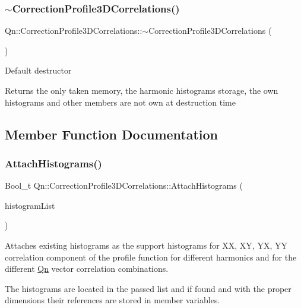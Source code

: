 \subsubsection{\texorpdfstring{$\sim$\+Correction\+Profile3\+D\+Correlations()}{~CorrectionProfile3DCorrelations()}}
{\footnotesize\ttfamily Qn\+::\+Correction\+Profile3\+D\+Correlations\+::$\sim$\+Correction\+Profile3\+D\+Correlations (\begin{DoxyParamCaption}{ }\end{DoxyParamCaption})\hspace{0.3cm}{\ttfamily [virtual]}}

Default destructor

Returns the only taken memory, the harmonic histograms storage, the own histograms and other members are not own at destruction time 

\subsection{Member Function Documentation}
\mbox{\label{classQn_1_1CorrectionProfile3DCorrelations_a6d6a1895f3362cd539f0249ad42d8b9c}} 
\subsubsection{\texorpdfstring{Attach\+Histograms()}{AttachHistograms()}}
{\footnotesize\ttfamily Bool\+\_\+t Qn\+::\+Correction\+Profile3\+D\+Correlations\+::\+Attach\+Histograms (\begin{DoxyParamCaption}\item[{T\+List $\ast$}]{histogram\+List }\end{DoxyParamCaption})\hspace{0.3cm}{\ttfamily [virtual]}}

Attaches existing histograms as the support histograms for XX, XY, YX, YY correlation component of the profile function for different harmonics and for the different \mbox{\hyperlink{namespaceQn}{Qn}} vector correlation combinations.

The histograms are located in the passed list and if found and with the proper dimensions their references are stored in member variables.

